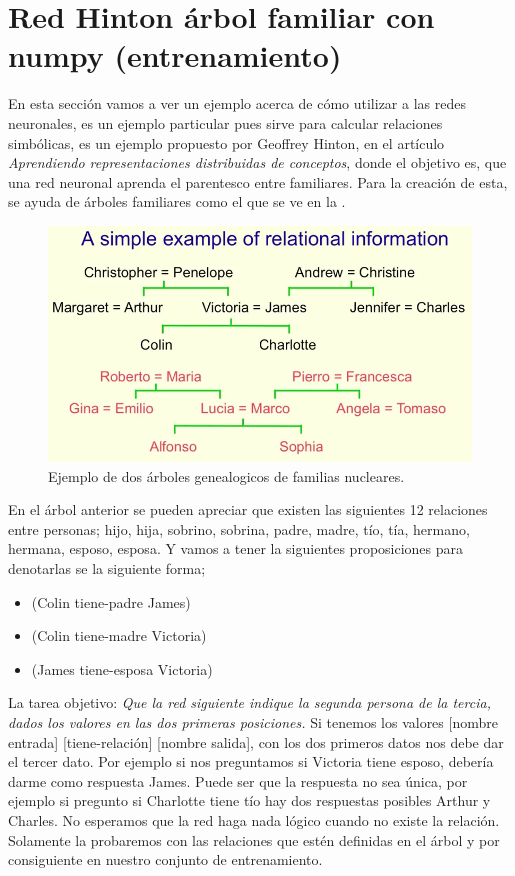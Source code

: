 \section{Red Hinton árbol familiar con numpy (entrenamiento)}

En esta sección vamos a ver un ejemplo acerca de cómo utilizar a las redes neuronales, es un ejemplo particular pues sirve para calcular relaciones simbólicas, es un ejemplo propuesto por Geoffrey Hinton, en el artículo \emph{Aprendiendo representaciones distribuidas de conceptos}, donde el objetivo es, que una red neuronal aprenda el parentesco entre familiares. Para la creación de esta, se ayuda de árboles familiares como el que se ve en la .
  
  \begin{figure}[h]
   \centering
   \includegraphics[scale=.5]{../Figuras/Hinton/ArbolGenealogico.png}
   \caption{Ejemplo de dos árboles genealogicos de familias nucleares.}
  \label{fig:arbolG}
  \end{figure}

En el árbol anterior se pueden apreciar que existen las siguientes 12 relaciones entre personas; hijo, hija, sobrino, sobrina, padre, madre, tío, tía, hermano, hermana, esposo, esposa. Y vamos a tener la siguientes proposiciones para denotarlas se la siguiente forma; 

\begin{itemize}
 \item (Colin tiene-padre James)
 \item(Colin tiene-madre Victoria)
 \item(James tiene-esposa Victoria)
\end{itemize}
La tarea objetivo: \textit{Que la red siguiente indique la segunda persona de la tercia, dados los valores en las dos primeras posiciones.} Si tenemos los valores [nombre entrada] [tiene-relación] [nombre salida], con los dos primeros datos nos debe dar el tercer dato.
Por ejemplo si nos preguntamos si Victoria tiene esposo, debería  darme como respuesta James. Puede ser que la respuesta no sea única, por ejemplo si pregunto si Charlotte tiene tío  hay dos respuestas posibles Arthur y Charles. No esperamos que la red haga nada lógico cuando no existe la relación. Solamente la probaremos con las relaciones que estén definidas en el árbol y por consiguiente en nuestro conjunto de entrenamiento. 

